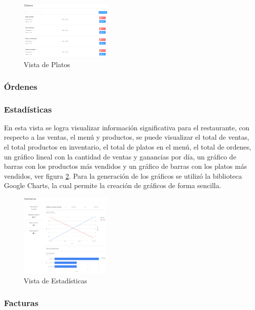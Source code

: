 \begin{figure}[H]
    \centering
    \includegraphics[width=0.4\textwidth]{assets/dishes.png}
    \caption{Vista de Platos}
    \label{fig:dishes}
\end{figure}

\subsubsection{Órdenes}

\subsubsection{Estadísticas}

En esta vista se logra visualizar información significativa para el 
restaurante, con respecto a las ventas, el menú y productos, se puede 
visualizar el total de ventas, el total productos en inventario, el total 
de platos en el menú, el total de ordenes, un gráfico lineal con la 
cantidad de ventas y ganancias por día, un gráfico de barras con los  
productos más vendidos y un gráfico de barras con los platos más vendidos, 
ver figura \ref{fig:statistics}. Para la generación de los gráficos se 
utilizó la biblioteca Google Charts, la cual permite la creación de
gráficos de forma sencilla.

\begin{figure}[H]
    \centering
    \includegraphics[width=0.4\textwidth]{assets/statistics.png}
    \caption{Vista de Estadísticas}
    \label{fig:statistics}
\end{figure}

\subsubsection{Facturas}

